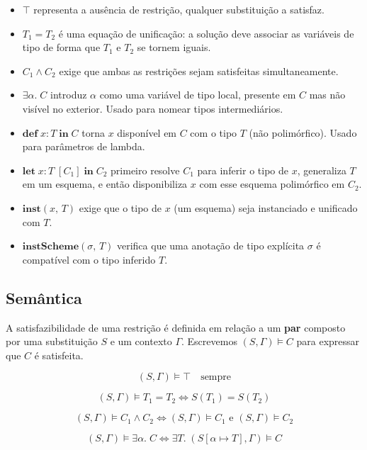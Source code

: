   \begin{itemize}
    \item
      \(\top\) representa a ausência de restrição, qualquer
      substituição a satisfaz.
    \item
      \(T_1 = T_2\) é uma equação de unificação: a solução deve associar
      as variáveis de tipo de forma que \(T_1\) e \(T_2\) se tornem iguais.
    \item
      \(C_1 \wedge C_2\) exige que ambas as restrições sejam
      satisfeitas simultaneamente.
    \item
      \(\exists \alpha.\; C\) introduz \(\alpha\) como uma variável de
      tipo local, presente em \(C\) mas não visível no exterior.
      Usado para nomear tipos intermediários.
    \item
      \(\mathbf{def}\; x : T\; \mathbf{in}\; C\) torna \(x\) disponível
      em \(C\) com o tipo \(T\) (não polimórfico). Usado para
      parâmetros de lambda.
    \item
      \(\mathbf{let}\; x : T\; [C_1]\; \mathbf{in}\; C_2\) primeiro
      resolve \(C_1\) para inferir o tipo de \(x\), generaliza \(T\) em
      um esquema, e então disponibiliza \(x\) com esse esquema
      polimórfico em \(C_2\).
    \item
      \(\mathbf{inst}(x,\, T)\) exige que o tipo de \(x\) (um esquema)
      seja instanciado e unificado com \(T\).
    \item
      \(\mathbf{instScheme}(\sigma,\, T)\) verifica que uma anotação de
      tipo explícita \(\sigma\) é compatível com o tipo inferido \(T\).
  \end{itemize}

  \subsection{Semântica}

  A satisfazibilidade de uma restrição é definida em relação a um
  \textbf{par} composto por uma substituição \(S\) e um contexto
  \(\Gamma\). Escrevemos \((S, \Gamma) \models
  C\) para expressar que \(C\) é satisfeita.

  \[ (S, \Gamma) \models \top \quad \text{sempre} \]

  \[ (S, \Gamma) \models T_1 = T_2 \iff S(T_1) = S(T_2) \]

  \[ (S, \Gamma) \models C_1 \wedge C_2 \iff (S, \Gamma) \models C_1 \text{ e }
  (S, \Gamma) \models C_2 \]

  \[ (S, \Gamma) \models \exists \alpha.\; C \iff \exists T.\; (S[\alpha
  \mapsto T], \Gamma) \models C \]

